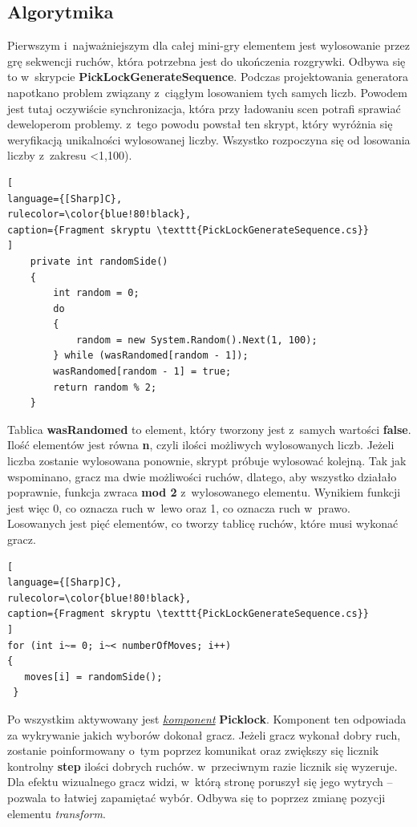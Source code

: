 \documentclass[oneside,polski,logo]{amuthesis}
\begin{document}
\subsection{Algorytmika}
\par Pierwszym i~najważniejszym dla całej mini-gry elementem jest wylosowanie przez grę sekwencji ruchów, która potrzebna jest do ukończenia rozgrywki. Odbywa się to w~skrypcie \textbf{PickLockGenerateSequence}. Podczas projektowania generatora napotkano problem związany z~ciągłym losowaniem tych samych liczb. Powodem jest tutaj oczywiście synchronizacja, która przy ładowaniu scen potrafi sprawiać deweloperom problemy. z~tego powodu powstał ten skrypt, który wyróżnia się weryfikacją unikalności wylosowanej liczby.
Wszystko rozpoczyna się od losowania liczby z~zakresu <1,100). \clearpage
\begin{lstlisting}[
language={[Sharp]C},
rulecolor=\color{blue!80!black},
caption={Fragment skryptu \texttt{PickLockGenerateSequence.cs}}
]
    private int randomSide()
    {
        int random = 0;
        do
        {
            random = new System.Random().Next(1, 100);
        } while (wasRandomed[random - 1]);
        wasRandomed[random - 1] = true;
        return random % 2;
    }
\end{lstlisting}
Tablica \textbf{wasRandomed} to element, który tworzony jest z~samych wartości \textbf{false}. Ilość elementów jest równa \textbf{n}, czyli ilości możliwych wylosowanych liczb. Jeżeli liczba zostanie wylosowana ponownie, skrypt próbuje wylosować kolejną. Tak jak wspominano, gracz ma dwie możliwości ruchów, dlatego, aby wszystko działało poprawnie, funkcja zwraca \textbf{mod 2} z~wylosowanego elementu. Wynikiem funkcji jest więc 0, co oznacza ruch w~lewo oraz 1, co oznacza ruch w~prawo. Losowanych jest pięć elementów, co tworzy tablicę ruchów, które musi wykonać gracz.

\begin{lstlisting}[
language={[Sharp]C},
rulecolor=\color{blue!80!black},
caption={Fragment skryptu \texttt{PickLockGenerateSequence.cs}}
]
for (int i~= 0; i~< numberOfMoves; i++)
{
   moves[i] = randomSide();
 }
\end{lstlisting}
Po wszystkim aktywowany jest \hyperref[sec:komponent]{\emph{komponent}} \textbf{Picklock}. Komponent ten odpowiada za wykrywanie jakich wyborów dokonał gracz. Jeżeli gracz wykonał dobry ruch, zostanie poinformowany o~tym poprzez komunikat oraz zwiększy się licznik kontrolny \textbf{step} ilości dobrych ruchów. w~przeciwnym razie licznik się wyzeruje. Dla efektu wizualnego gracz widzi, w~którą stronę poruszył się jego wytrych – pozwala to łatwiej zapamiętać wybór. Odbywa się to poprzez zmianę pozycji elementu \emph{transform}.
\end{document}
